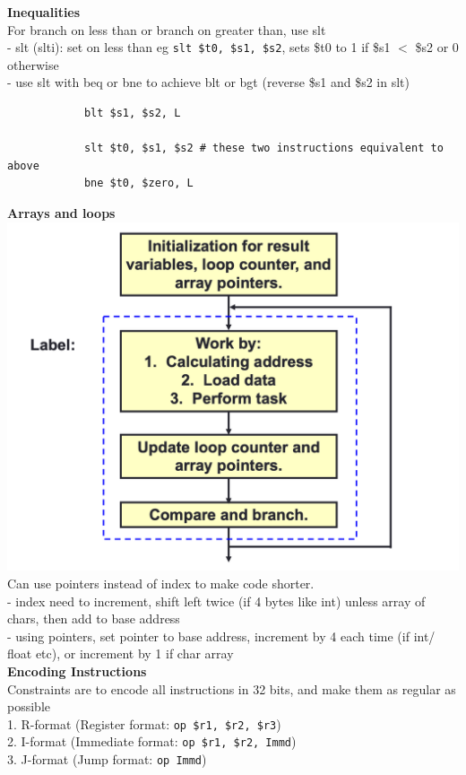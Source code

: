 \documentclass[10pt, a4paper]{article}
\begin{document}
\begin{multicols*}{3}
		\textbf{Inequalities}\\
		For branch on less than or branch on greater than, use slt\\
		- slt (slti): set on less than eg \texttt{slt \$t0, \$s1, \$s2}, sets \$t0 to 1 if \$s1 $<$ \$s2 or 0 otherwise\\
		- use slt with beq or bne to achieve blt or bgt (reverse \$s1 and \$s2 in slt)
		\begin{verbatim}
			blt $s1, $s2, L
			
			slt $t0, $s1, $s2 # these two instructions equivalent to above
			bne $t0, $zero, L
		\end{verbatim}
		\textbf{Arrays and loops}\\
		\includegraphics[scale=0.3]{./assets/arrayFlowchart}\\
		Can use pointers instead of index to make code shorter. \\
		- index need to increment, shift left twice (if 4 bytes like int) unless array of chars, then add to base address\\
		- using pointers, set pointer to base address, increment by 4 each time (if int/ float etc), or increment by 1 if char array\\
		
		\textbf{Encoding Instructions}\\
		Constraints are to encode all instructions in 32 bits, and make them as regular as possible\\
		1. R-format (Register format: \texttt{op \$r1, \$r2, \$r3})\\
		2. I-format (Immediate format: \texttt{op \$r1, \$r2, Immd})\\
		3. J-format (Jump format: \texttt{op Immd})\\
		

\end{multicols*}
\end{document}
